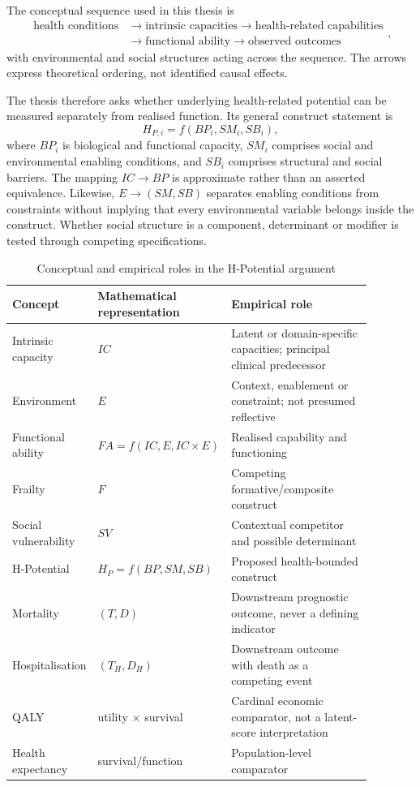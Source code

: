 The conceptual sequence used in this thesis is
\begin{equation}
\boxed{\begin{aligned}
\text{health conditions}&\longrightarrow\text{intrinsic capacities}
\longrightarrow\text{health-related capabilities}\\
&\longrightarrow\text{functional ability}
\longrightarrow\text{observed outcomes}
\end{aligned}},
\label{eq:conceptual_sequence}
\end{equation}
with environmental and social structures acting across the sequence. The
arrows express theoretical ordering, not identified causal effects.

The thesis therefore asks whether underlying health-related potential can be
measured separately from realised function. Its general construct statement is
\begin{equation}
\boxed{H_{P,i}=f(BP_i,SM_i,SB_i)},
\label{eq:hp_general_class}
\end{equation}
where $BP_i$ is biological and functional capacity, $SM_i$ comprises social and
environmental enabling conditions, and $SB_i$ comprises structural and social
barriers. The mapping $IC\rightarrow BP$ is approximate rather than an asserted
equivalence. Likewise, $E\rightarrow(SM,SB)$ separates enabling conditions from
constraints without implying that every environmental variable belongs inside
the construct. Whether social structure is a component, determinant or modifier
is tested through competing specifications.

\begin{table}[htbp]
\centering
\caption{Conceptual and empirical roles in the H-Potential argument}
\label{tab:concept_roles}
\small
\begin{tabular}{p{0.22\linewidth}p{0.22\linewidth}p{0.44\linewidth}}
\hline
Concept & Mathematical representation & Empirical role \\
\hline
Intrinsic capacity & $IC$ & Latent or domain-specific capacities; principal clinical predecessor \\
Environment & $E$ & Context, enablement or constraint; not presumed reflective \\
Functional ability & $FA=f(IC,E,IC\times E)$ & Realised capability and functioning \\
Frailty & $F$ & Competing formative/composite construct \\
Social vulnerability & $SV$ & Contextual competitor and possible determinant \\
H-Potential & $H_P=f(BP,SM,SB)$ & Proposed health-bounded construct \\
Mortality & $(T,D)$ & Downstream prognostic outcome, never a defining indicator \\
Hospitalisation & $(T_H,D_H)$ & Downstream outcome with death as a competing event \\
QALY & utility $\times$ survival & Cardinal economic comparator, not a latent-score interpretation \\
Health expectancy & survival/function & Population-level comparator \\
\hline
\end{tabular}
\end{table}

